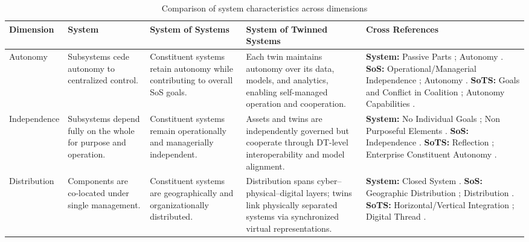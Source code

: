 \begin{table}[htbp]
\centering
\caption{Comparison of system characteristics across \citet{nielsen2015systems} dimensions}
\label{tab:sys_sos_sots_comparison}
\scriptsize
\renewcommand{\arraystretch}{1.15}
\setlength{\tabcolsep}{3pt}

\begin{adjustbox}{center}
\begin{tabularx}{1.15\textwidth}{
  >{\raggedright\arraybackslash}p{2.5cm}
  >{\raggedright\arraybackslash}p{3cm}
  >{\raggedright\arraybackslash}p{3cm}
  >{\raggedright\arraybackslash}p{3.7cm}
  >{\raggedright\arraybackslash}X }
\hline
\textbf{Dimension} & 
\textbf{System} & 
\textbf{System of Systems} & 
\textbf{System of Twinned Systems} &
\textbf{Cross References}\\
\hline

Autonomy &
Subsystems cede autonomy to centralized control. &
Constituent systems retain autonomy while contributing to overall SoS goals. &
Each twin maintains autonomy over its data, models, and analytics, enabling self-managed operation and cooperation. &
\textbf{System:} Passive Parts \cite{jackson1984towards}; Autonomy \cite{boardman2006system}.\newline
\textbf{SoS:} Operational/Managerial Independence \cite{maier1998architecting}; Autonomy \cite{nielsen2015systems}.\newline
\textbf{SoTS:} Goals and Conflict in Coalition \cite{borth2019digital}; Autonomy Capabilities \cite{dietz2020digital}. \\

\hline

Independence &
Subsystems depend fully on the whole for purpose and operation. &
Constituent systems remain operationally and managerially independent. &
Assets and twins are independently governed but cooperate through DT-level interoperability and model alignment. &
\textbf{System:} No Individual Goals \cite{jackson1984towards}; Non Purposeful Elements \cite{ackoff1971towards}.\newline
\textbf{SoS:} Independence \cite{nielsen2015systems}.\newline
\textbf{SoTS:} Reflection \cite{borth2019digital}; Enterprise Constituent Autonomy \cite{dietz2020digital}. \\

\hline

Distribution &
Components are co-located under single management. &
Constituent systems are geographically and organizationally distributed. &
Distribution spans cyber--physical--digital layers; twins link physically separated systems via synchronized virtual representations. &
\textbf{System:} Closed System \cite{ackoff1971towards}.\newline
\textbf{SoS:} Geographic Distribution \cite{maier1998architecting}; Distribution \cite{nielsen2015systems}.\newline
\textbf{SoTS:} Horizontal/Vertical Integration \cite{michael2022integration}; Digital Thread \cite{borth2019digital}. \\


\end{tabularx}
\end{adjustbox}
\end{table}
